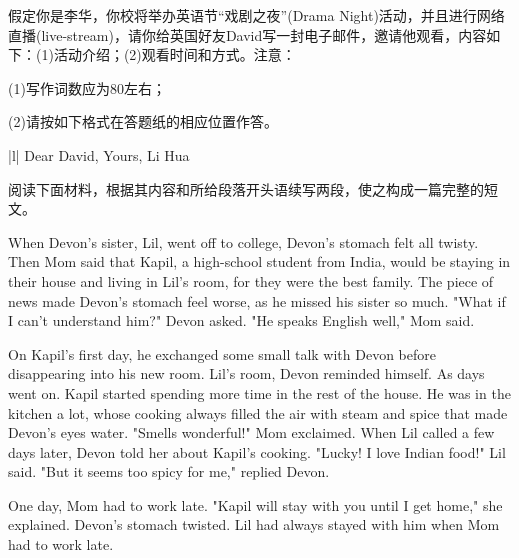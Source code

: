\documentclass{英语试卷}
\begin{document}
\par 假定你是李华，你校将举办英语节“戏剧之夜”(Drama Night)活动，并且进行网络直播(live-stream)，请你给英国好友David写一封电子邮件，邀请他观看，内容如下：(1)活动介绍；(2)观看时间和方式。注意：\par
\par (1)写作词数应为80左右；\par
\par (2)请按如下格式在答题纸的相应位置作答。\par
\par\vspace{0.4em}
\begin{center}\begin{tabular}{{|l|}}
\hline
Dear David, Yours, Li Hua \\
\hline
\end{tabular}\end{center}
\vspace{0.4em}
\par 阅读下面材料，根据其内容和所给段落开头语续写两段，使之构成一篇完整的短文。\par
\par When Devon's sister, Lil, went off to college, Devon's stomach felt all twisty. Then Mom said that Kapil, a high-school student from India, would be staying in their house and living in Lil's room, for they were the best family. The piece of news made Devon's stomach feel worse, as he missed his sister so much. "What if I can't understand him?" Devon asked. "He speaks English well," Mom said.\par
\par On Kapil's first day, he exchanged some small talk with Devon before disappearing into his new room. Lil's room, Devon reminded himself. As days went on. Kapil started spending more time in the rest of the house. He was in the kitchen a lot, whose cooking always filled the air with steam and spice that made Devon's eyes water. "Smells wonderful!" Mom exclaimed. When Lil called a few days later, Devon told her about Kapil's cooking. "Lucky! I love Indian food!" Lil said. "But it seems too spicy for me," replied Devon.\par
\par One day, Mom had to work late. "Kapil will stay with you until I get home," she explained. Devon's stomach twisted. Lil had always stayed with him when Mom had to work late.\par
\end{document}
